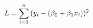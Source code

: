 \documentclass[preview]{standalone}
\begin{document}
\begin{align*}
\special{dvisvgm:raw <g id='unique000'>}L = \sum_{i=1}^n{(y_i-(\beta_0+\beta_1 x_i))^2}\special{dvisvgm:raw </g>}
\end{align*}
\end{document}

